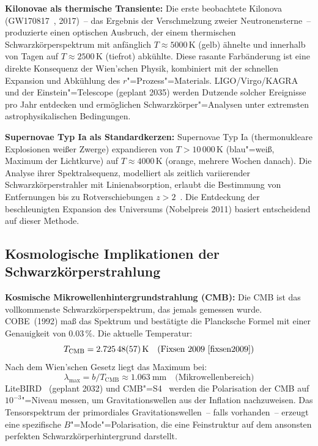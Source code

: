 ﻿\documentclass[a4paper,12pt]{article}
\theoremstyle{definition}
\begin{document}
\textbf{Kilonovae als thermische Transiente:}
Die erste beobachtete Kilonova (GW170817~\cite{abbott2017}, 2017)~-- das
Ergebnis der Verschmelzung zweier Neutronensterne~-- produzierte einen
optischen Ausbruch, der einem thermischen Schwarzkörperspektrum mit
anfänglich $T \approx 5000\,\text{K}$ (gelb) ähnelte und innerhalb von
Tagen auf $T \approx 2500\,\text{K}$ (tiefrot) abkühlte. Diese rasante
Farbänderung ist eine direkte Konsequenz der Wien'schen Physik, kombiniert
mit der schnellen Expansion und Abkühlung des $r$"=Prozess"=Materials.
LIGO/Virgo/KAGRA~\cite{abbott2017} und der Einstein"=Telescope (geplant 2035)
werden Dutzende solcher Ereignisse pro Jahr entdecken und ermöglichen
Schwarzkörper"=Analysen unter extremsten astrophysikalischen Bedingungen.

\textbf{Supernovae Typ Ia als Standardkerzen:}
Supernovae Typ Ia (thermonukleare Explosionen weißer Zwerge) expandieren
von $T > 10\,000\,\text{K}$ (blau"=weiß, Maximum der Lichtkurve)
auf $T \approx 4000\,\text{K}$ (orange, mehrere Wochen danach).
Die Analyse ihrer Spektralsequenz, modelliert als zeitlich variierender
Schwarzkörperstrahler mit Linienabsorption, erlaubt die Bestimmung
von Entfernungen bis zu Rotverschiebungen $z > 2$~\cite{perlmutter1999}.
Die Entdeckung der beschleunigten Expansion des Universums (Nobelpreis 2011)
basiert entscheidend auf dieser Methode.

\subsection{Kosmologische Implikationen der Schwarzkörperstrahlung}

\textbf{Kosmische Mikrowellenhintergrundstrahlung (CMB):}
Die CMB ist das vollkommenste Schwarzkörperspektrum, das jemals gemessen
wurde. COBE~(1992) maß das Spektrum und bestätigte die Plancksche Formel
mit einer Genauigkeit von $0.03\,\%$. Die aktuelle Temperatur:
\[
    T_{\text{CMB}} = \SI{2.72548 \pm 0.00057}{\kelvin}
    \quad \text{(Fixsen 2009~\cite{fixsen2009})}
\]
Nach dem Wien'schen Gesetz liegt das Maximum bei:
\[
    \lambda_{\max} = b / T_{\text{CMB}} \approx \SI{1.063}{\milli\metre}
    \quad \text{(Mikrowellenbereich)}
\]
LiteBIRD~\cite{litebird2023} (geplant 2032) und CMB"=S4~\cite{cmbs4}
werden die Polarisation der CMB auf $10^{-3}$"=Niveau messen, um
Gravitationswellen aus der Inflation nachzuweisen. Das Tensorspektrum
der primordiales Gravitationswellen~-- falls vorhanden~-- erzeugt
eine spezifische $B$"=Mode"=Polarisation, die eine Feinstruktur auf
dem ansonsten perfekten Schwarzkörperhintergrund darstellt.
\end{document}
